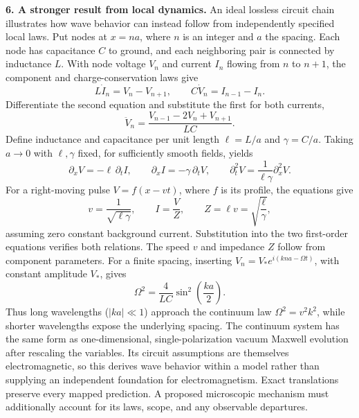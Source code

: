 \documentclass[11pt,letterpaper]{article}
\begin{document}
\textbf{6. A stronger result from local dynamics.}
An ideal lossless circuit chain illustrates how wave behavior can instead follow from independently specified local laws. Put nodes at $x=na$, where $n$ is an integer and $a$ the spacing. Each node has capacitance $C$ to ground, and each neighboring pair is connected by inductance $L$. With node voltage $V_n$ and current $I_n$ flowing from $n$ to $n+1$, the component and charge-conservation laws give
\begin{equation}
L\dot I_n=V_n-V_{n+1},\qquad C\dot V_n=I_{n-1}-I_n.
\end{equation}
Differentiate the second equation and substitute the first for both currents,
\begin{equation}
\ddot V_n=\frac{V_{n-1}-2V_n+V_{n+1}}{LC}.
\end{equation}
Define inductance and capacitance per unit length $\ell=L/a$ and $\gamma=C/a$. Taking $a\to0$ with $\ell,\gamma$ fixed, for sufficiently smooth fields, yields
\begin{equation}
\partial_xV=-\ell\,\partial_t I,\qquad
\partial_xI=-\gamma\,\partial_t V,
\qquad \partial_t^2V=\frac1{\ell\gamma}\partial_x^2V.
\end{equation}
For a right-moving pulse $V=f(x-vt)$, where $f$ is its profile, the equations give
\begin{equation}
v=\frac1{\sqrt{\ell\gamma}},\qquad
I=\frac VZ,\qquad Z=\ell v=\sqrt{\frac\ell\gamma},
\end{equation}
assuming zero constant background current. Substitution into the two first-order equations verifies both relations. The speed $v$ and impedance $Z$ follow from component parameters. For a finite spacing, inserting $V_n=V_*e^{i(kna-\Omega t)}$, with constant amplitude $V_*$, gives
\begin{equation}
\Omega^2=\frac4{LC}\sin^2\!\left(\frac{ka}{2}\right).
\end{equation}
Thus long wavelengths ($|ka|\ll1$) approach the continuum law $\Omega^2=v^2k^2$, while shorter wavelengths expose the underlying spacing. The continuum system has the same form as one-dimensional, single-polarization vacuum Maxwell evolution after rescaling the variables. Its circuit assumptions are themselves electromagnetic, so this derives wave behavior within a model rather than supplying an independent foundation for electromagnetism. Exact translations preserve every mapped prediction. A proposed microscopic mechanism must additionally account for its laws, scope, and any observable departures.
\end{document}
